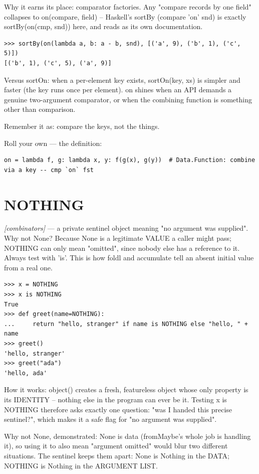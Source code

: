 \documentclass[11pt,letterpaper]{book}
\begin{document}
Why it earns its place: comparator factories. Any "compare records by one field" collapses to on(compare, field) -- Haskell's sortBy (compare 'on' snd) is exactly sortBy(on(cmp, snd)) here, and reads as its own documentation.

\begin{lstlisting}[style=spec]
>>> sortBy(on(lambda a, b: a - b, snd), [('a', 9), ('b', 1), ('c', 5)])
[('b', 1), ('c', 5), ('a', 9)]
\end{lstlisting}

Versus sortOn: when a per-element key exists, sortOn(key, xs) is simpler and faster (the key runs once per element). on shines when an API demands a genuine two-argument comparator, or when the combining function is something other than comparison.


Remember it as: compare the keys, not the things.


Roll your own --- the definition:

\begin{lstlisting}[style=code]
on = lambda f, g: lambda x, y: f(g(x), g(y))  # Data.Function: combine via a key -- cmp `on` fst
\end{lstlisting}

\section{NOTHING}
\noindent\textit{[combinators]} --- a private sentinel object meaning "no argument was supplied". Why not None? Because None is a legitimate VALUE a caller might pass; NOTHING can only mean "omitted", since nobody else has a reference to it. Always test with 'is'. This is how foldl and accumulate tell an absent initial value from a real one.
\begin{lstlisting}[style=spec]
>>> x = NOTHING
>>> x is NOTHING
True
>>> def greet(name=NOTHING):
...     return "hello, stranger" if name is NOTHING else "hello, " + name
>>> greet()
'hello, stranger'
>>> greet("ada")
'hello, ada'
\end{lstlisting}

How it works: object() creates a fresh, featureless object whose only property is its IDENTITY -- nothing else in the program can ever be it. Testing x is NOTHING therefore asks exactly one question: "was I handed this precise sentinel?", which makes it a safe flag for "no argument was supplied".


Why not None, demonstrated: None is data (fromMaybe's whole job is handling it), so using it to also mean "argument omitted" would blur two different situations. The sentinel keeps them apart: None is Nothing in the DATA; NOTHING is Nothing in the ARGUMENT LIST.
\end{document}
